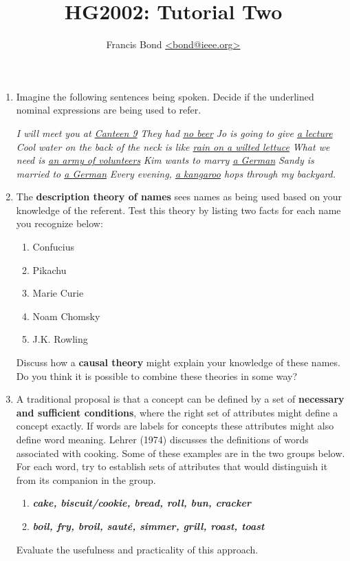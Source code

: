 \documentclass[a4paper]{article}
\title{HG2002: Tutorial Two}
\author{Francis Bond \url{<bond@ieee.org>}}
\date{}%
\newcommand{\lex}[1]{\textbf{\textit{#1}}}
\newcommand{\ul}[1]{\uline{#1}}
\newcommand{\txx}[1]{\textbf{#1}}
\begin{document}
\maketitle

\begin{enumerate}
\item Imagine the following sentences being spoken.  Decide if the
  underlined nominal expressions are being used to refer.
  \begin{exe}
  \ex \textit{I will meet you at \ul{Canteen 9}}
  \ex \textit{They had \ul{no beer}}
  \ex \textit{Jo is going to give \ul{a lecture}}
  \ex \textit{Cool water on the back of the neck is like \ul{rain on a wilted lettuce}}
  \ex \textit{What we need is \ul{an army of volunteers}}
  \ex \textit{Kim wants to marry \ul{a German}}
  \ex \textit{Sandy is married to \ul{a German}}
  \ex \textit{Every evening, \ul{a kangaroo} hops through my backyard.}
  \end{exe}
\item The \txx{description theory of names} sees names as being used
  based on your knowledge of the referent.  Test this theory by
  listing two facts for each name you recognize below:
  \begin{enumerate}
  \item Confucius
  \item Pikachu
  \item Marie Curie
  \item Noam Chomsky
  \item J.K. Rowling
  \end{enumerate}
  Discuss how a \txx{causal theory} might explain your knowledge of
  these names.  Do you think it is possible to combine these theories
  in some way?

\newpage

\item A traditional proposal is that a concept can be defined by a set
  of \txx{necessary and sufficient conditions}, where the right set of
  attributes might define a concept exactly. If words are labels for
  concepts these attributes might also define word meaning. Lehrer
  (1974) discusses the definitions of words associated with
  cooking. Some of these examples are in the two groups below. For
  each word, try to establish sets of attributes that would
  distinguish it from its companion in the group.
  \begin{enumerate}
  \item \lex{cake, biscuit/cookie, bread,  roll, bun, cracker}
  \item \lex{boil, fry, broil, saut\'e, simmer, grill, roast, toast}
  \end{enumerate}
  Evaluate the usefulness and practicality of this approach.


\end{enumerate}
\end{document}
